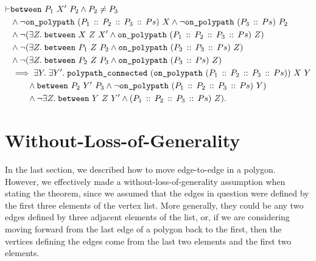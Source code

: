 \begin{equation}\label{eq:PolygonMove}
  \begin{split}
\vdash    &\texttt{between}\ P_1\ X'\ P_2 \wedge P_2 \neq P_3\\
    &\wedge \neg\texttt{on\_polypath}\ (P_1\,::\,P_2\,::\,P_3\,::\,Ps)\ X \wedge \neg\texttt{on\_polypath}\ (P_3\,::\,Ps)\ P_2\\
    &\wedge \neg(\exists Z.\; \texttt{between}\ X\ Z\ X' \wedge \texttt{on\_polypath}\ (P_1\,::\,P_2\,::\,P_3\,::\,Ps)\ Z)\\
    &\wedge \neg(\exists Z.\; \texttt{between}\ P_1\ Z\ P_2 \wedge \texttt{on\_polypath}\ (P_2\,::\,P_3\,::\,Ps)\ Z)\\
    &\wedge \neg(\exists Z.\; \texttt{between}\ P_2\ Z\ P_3 \wedge \texttt{on\_polypath}\ (P_3\,::\,Ps)\ Z)\\
    &\implies \exists Y.\;\exists Y'.\; \texttt{polypath\_connected}\ (\texttt{on\_polypath}\ (P_1\,::\,P_2\,::\,P_3\,::\,Ps))\ X\ Y\\
    &\qquad\wedge \texttt{between}\ P_2\ Y'\ P_3\wedge \neg\texttt{on\_polypath}\ (P_1\,::\,P_2\,::\,P_3\,::\,Ps)\ Y)\\
    &\qquad\wedge \neg\exists Z.\; \texttt{between}\ Y\ Z\ Y' \wedge (P_1\,::\,P_2\,::\,P_3\,::\,Ps)\ Z).
  \end{split}
\end{equation}

\section{Without-Loss-of-Generality}
In the last section, we described how to move edge-to-edge in a polygon. However, we effectively made a without-loss-of-generality assumption when stating the theorem, since we assumed that the edges in question were defined by the first three elements of the vertex list. More generally, they could be any two edges defined by  three adjacent elements of the list, or, if we are considering moving forward from the last edge of a polygon back to the first, then the vertices defining the edges come from the last two elements and the first two elements.

